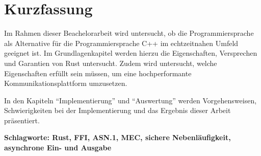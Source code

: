 \chapter*{Kurzfassung}

Im Rahmen dieser Beachelorarbeit wird untersucht, ob die Programmiersprache als Alternative für die Programmiersprache C++ im echtzeitnahen Umfeld geeignet ist.
Im Grundlagenkapitel werden hierzu die Eigenschaften, Versprechen und Garantien von Rust untersucht.
Zudem wird untersucht, welche Eigenschaften erfüllt sein müssen, um eine hochperformante Kommunikationsplattform umzusetzen.

In den Kapiteln \enquote{Implementierung} und \enquote{Auswertung} werden Vorgehensweisen, Schwierigkeiten bei der Implementierung und das Ergebnis dieser Arbeit präsentiert.

\textbf{Schlagworte: Rust, FFI, ASN.1, MEC, sichere Nebenläufigkeit, asynchrone Ein- und Ausgabe}
